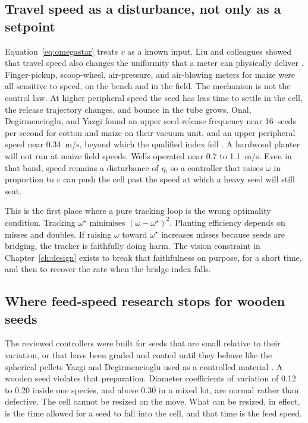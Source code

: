 \subsection{Travel speed as a disturbance, not only as a setpoint}

Equation~\eqref{eq:omegastar} treats $v$ as a known input. Liu and colleagues showed that travel speed also changes the uniformity that a meter can physically deliver \cite{liu2017speed}. Finger-pickup, scoop-wheel, air-pressure, and air-blowing meters for maize were all sensitive to speed, on the bench and in the field. The mechanism is not the control law. At higher peripheral speed the seed has less time to settle in the cell, the release trajectory changes, and bounce in the tube grows. Onal, Degirmencioglu, and Yazgi found an upper seed-release frequency near 16~seeds per second for cotton and maize on their vacuum unit, and an upper peripheral speed near 0.34~m/s, beyond which the qualified index fell \cite{onal2012}. A hardwood planter will not run at maize field speeds. Wells operated near 0.7 to 1.1~m/s. Even in that band, speed remains a disturbance of $\eta$, so a controller that raises $\omega$ in proportion to $v$ can push the cell past the speed at which a heavy seed will still seat.

This is the first place where a pure tracking loop is the wrong optimality condition. Tracking $\omega^{\star}$ minimises $(\omega-\omega^{\star})^2$. Planting efficiency depends on misses and doubles. If raising $\omega$ toward $\omega^{\star}$ increases misses because seeds are bridging, the tracker is faithfully doing harm. The vision constraint in Chapter~\ref{ch:design} exists to break that faithfulness on purpose, for a short time, and then to recover the rate when the bridge index falls.

\subsection{Where feed-speed research stops for wooden seeds}

The reviewed controllers were built for seeds that are small relative to their variation, or that have been graded and coated until they behave like the spherical pellets Yazgi and Degirmencioglu used as a controlled material \cite{yazgi2015}. A wooden seed violates that preparation. Diameter coefficients of variation of 0.12 to 0.20 inside one species, and above 0.30 in a mixed lot, are normal rather than defective. The cell cannot be resized on the move. What can be resized, in effect, is the time allowed for a seed to fall into the cell, and that time is the feed speed.

